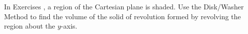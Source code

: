 {\noindent In Exercises}
{, a region of the Cartesian plane is shaded. Use the Disk/Washer Method to find the volume of the solid of revolution formed by revolving the region about the $y$-axis.
}
